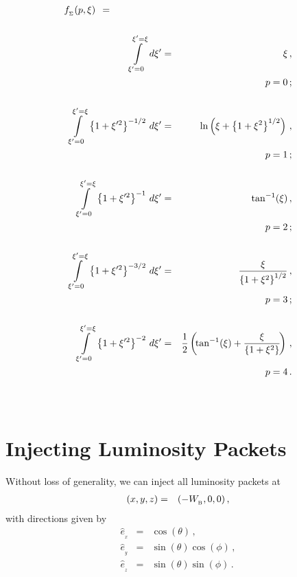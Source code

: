 \documentclass[usenatbib]{mn2e}
\newcommand{\subB}{_{_{\rm B}}}
\numberwithin{equation}{section}
\begin{document}
\begin{eqnarray}\nonumber
f_{_\Sigma}(p,\xi)\;\,=\hspace{1.9cm}&&\\\nonumber&&\\\nonumber
\int\limits_{\xi'=0}^{\xi'=\xi}\,d\xi'&=&\xi\,,\\\nonumber
&&\hspace{2.0cm}p=0\,;\\\nonumber&&\\\nonumber
\int\limits_{\xi'=0}^{\xi'=\xi}\,\left\{1+\xi'^2\right\}^{-1/2}\,d\xi'&=&\ln\left(\xi+\left\{1+\xi^2\right\}^{1/2}\right)\,,\\\nonumber
&&\hspace{2.0cm}p=1\,;\\\nonumber&&\\\nonumber
\int\limits_{\xi'=0}^{\xi'=\xi}\,\left\{1+\xi'^2\right\}^{-1}\,d\xi'&=&\tan^{-1}(\xi)\,,\\\nonumber
&&\hspace{2.0cm}p=2\,;\\\nonumber&&\\\nonumber
\int\limits_{\xi'=0}^{\xi'=\xi}\,\left\{1+\xi'^2\right\}^{-3/2}\,d\xi'&=&\frac{\xi}{\left\{1+\xi^2\right\}^{1/2}}\,,\\\nonumber
&&\hspace{2.0cm}p=3\,;\\\nonumber&&\\\nonumber
\int\limits_{\xi'=0}^{\xi'=\xi}\,\left\{1+\xi'^2\right\}^{-2}\,d\xi'&=&\frac{1}{2}\left(\!\tan^{-1}(\xi)+\frac{\xi}{\left\{1+\xi^2\right\}}\!\right)\,,\\\nonumber
&&\hspace{2.0cm}p=4\,.\\\nonumber&&\\\nonumber
\end{eqnarray}





\section{Injecting Luminosity Packets}\label{APP:InjectingLuminosityPackets}

Without loss of generality, we can inject all luminosity packets at 
\begin{eqnarray}
(x,y,z)&=&(-W\subB,0,0)\,,
\end{eqnarray}
with directions given by
\begin{eqnarray}
{\hat e}_{_x}&=&\cos(\theta)\,,\\
{\hat e}_{_y}&=&\sin(\theta)\cos(\phi)\,,\\
{\hat e}_{_z}&=&\sin(\theta)\sin(\phi)\,.
\end{eqnarray}
\end{document}
